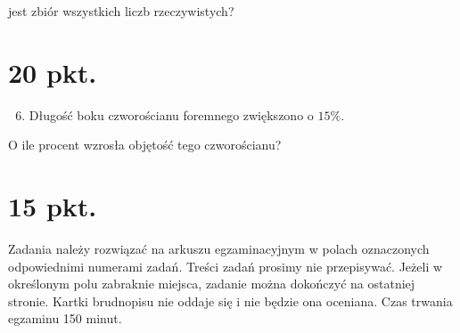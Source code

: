 \documentclass[10pt]{article}
\begin{document}
jest zbiór wszystkich liczb rzeczywistych?

\section*{20 pkt.}
\begin{enumerate}
  \setcounter{enumi}{5}
  \item Długość boku czworościanu foremnego zwiększono o \(15 \%\).
\end{enumerate}

O ile procent wzrosła objętość tego czworościanu?

\section*{15 pkt.}
Zadania należy rozwiązać na arkuszu egzaminacyjnym w polach oznaczonych odpowiednimi numerami zadań. Treści zadań prosimy nie przepisywać. Jeżeli w określonym polu zabraknie miejsca, zadanie można dokończyć na ostatniej stronie. Kartki brudnopisu nie oddaje się i nie będzie ona oceniana. Czas trwania egzaminu 150 minut.
\end{document}
